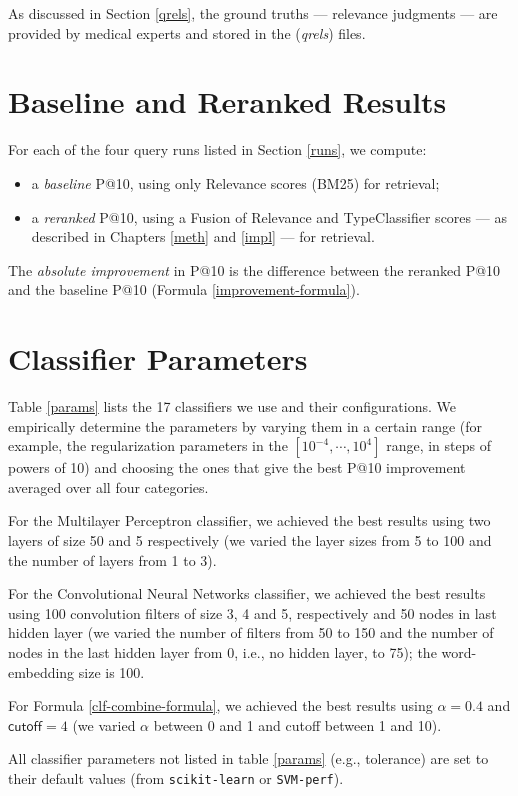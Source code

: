 As discussed in Section \ref{qrels}, the ground truths --- relevance judgments --- are provided by medical experts
and stored in the (\emph{qrels}) files.

\section{Baseline and Reranked Results}
For each of the four query runs listed in Section \ref{runs}, we compute:
\begin{itemize}
 \item a \emph{baseline} P@10, using only \textsf{Relevance} scores (BM25) for retrieval;
 \item a \emph{reranked} P@10,
 using a \textsf{Fusion} of \textsf{Relevance} and \textsf{TypeClassifier} scores --- as described in Chapters \ref{meth} and \ref{impl} --- for retrieval.
\end{itemize}
The \emph{absolute improvement} in P@10 is the difference between the reranked P@10 and the baseline P@10 (Formula \ref{improvement-formula}).

\section{Classifier Parameters}
Table \ref{params} lists the 17 classifiers we use and their configurations.
We empirically determine
the
parameters by varying them in a certain range (for example, the regularization parameters
in the $[10^{-4},\cdots,10^4]$ range, in steps of powers of 10) and choosing the ones
that give the
best P@10 improvement averaged over all four categories.

For the Multilayer Perceptron classifier, we achieved the best results using two layers of size 50 and 5 respectively
(we varied the layer sizes from 5 to 100 and the number of layers from 1 to 3).

For the Convolutional Neural Networks classifier, we achieved the best results
using 100 convolution filters of size 3, 4 and 5, respectively and 50 nodes in last hidden layer
(we varied the number of filters from 50 to 150
and the number of nodes in the last hidden layer from 0, i.e., no hidden layer, to 75); the word-embedding size is 100.

For Formula \ref{clf-combine-formula}, we achieved the best results using
$\alpha=0.4$ and $\textsf{cutoff}=4$ (we varied $\alpha$  between 0 and 1 and \textsf{cutoff} between 1 and 10).

All classifier parameters not listed in table \ref{params} (e.g., tolerance) are set to their default values (from \texttt{scikit-learn} or \texttt{SVM-perf}).

